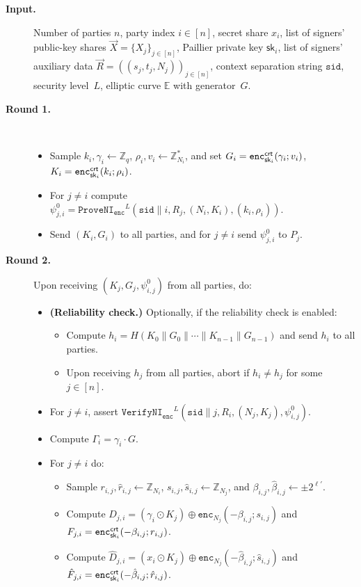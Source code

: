 \documentclass[11pt]{article}
\def\crt{{\sf crt}}
\newcommand{\enc}{\ensuremath{\mathtt{enc}}}
\newcommand{\enci}[1]{\ensuremath{\mathtt{enc}_{N_{#1}}}}
\newcommand{\sid}{\ensuremath{\mathtt{sid}}}
\newcommand{\proveni}[1]{\ensuremath{\mathtt{ProveNI}_{\mathtt{#1}}}}
\newcommand{\verifyni}[1]{\ensuremath{\mathtt{VerifyNI}_{\mathtt{#1}}}}
\newcommand{\sk}{\textsf{sk}}
\newcommand{\pk}{\textsf{pk}}
\newcommand{\E}{\mathbb{E}}
\newcommand{\Z}{\mathbb{Z}}
\newcommand{\?}[1]{\stackrel{?}{#1}}
\begin{document}
\begin{description}
    \item[\textbf{Input.}] Number of parties $n$, party index $i\in [n]$, secret share $x_i$, list of signers' public-key shares $\vec X = \{X_j\}_{j \in [n]}$, 
    Paillier private key $\sk_i$, list of signers' auxiliary data $\vec R = ((s_j, t_j, N_j))_{j\in[n]}$, context separation string $\sid$, security level~$L$, elliptic curve $\E$ with generator~$G$.

    \item[\textbf{Round 1.}] \
    \begin{itemize}
        \item Sample $k_i, \gamma_i \gets \Z_q$, $\rho_i, v_i \gets \Z^*_{N_i}$, and set $G_i = \enc^\crt_{\sk_i}(\gamma_i; v_i)$,
            $K_i = \enc^\crt_{\sk_i}(k_i; \rho_i)$. 
        \item For $j \ne i$ compute $\psi^0_{j,i} = \proveni{enc}^{L}(\sid \| i, R_j, (N_i, K_i), (k_i, \rho_i))$. 
        \item Send $(K_i, G_i)$ to all parties, and for $j \neq i$ send $\psi^0_{j,i}$ to $P_j$.
    \end{itemize}


    \item[\textbf{Round 2.}] Upon receiving $(K_j, G_j, \psi^0_{i,j})$ from all parties, do:
    \begin{itemize}
     \item {\bf (Reliability check.)} Optionally, if the reliability check is enabled:
    \begin{itemize}
        \item Compute $h_i = H(K_0 \| G_0 \| \cdots \| K_{n-1} \| G_{n-1})$
        and 
        send $h_i$ to all parties.
        
        \item Upon receiving $h_j$ from all parties, abort if 
        $h_i \neq h_j$ for some $j \in [n]$.
    \end{itemize}
        \item For $j \neq i$, assert $\verifyni{enc}^{L}(\sid \| j, R_i, (N_j, K_j), \psi^0_{i,j})$. 
        
        \item Compute $\Gamma_i = \gamma_i \cdot G$.
        \item For $j \neq i$ do:
        \begin{itemize}
            \item Sample $r_{i,j}, \hat{r}_{i,j} \gets \Z_{N_i}$,
                $s_{i,j}, \hat{s}_{i,j} \gets \Z_{N_j}$, and
                $\beta_{i,j}, \hat{\beta}_{i,j} \gets \pm 2^{\ell'}$.
            \item Compute $D_{j,i} = (\gamma_i \odot K_j) \oplus \enci{j}(-\beta_{i,j}; s_{i,j})$
                and $F_{j,i} = \enc^\crt_{\sk_i}(-\beta_{i,j}; r_{i,j})$.
            \item Compute $\hat{D}_{j,i} = (x_i \odot K_j) \oplus \enci{j}(-\hat{\beta}_{i,j}; \hat{s}_{i,j})$
                and $\hat{F}_{j,i} = \enc^\crt_{\sk_i}(-\hat{\beta}_{i,j}; \hat{r}_{i,j})$.


\end{itemize}
\end{itemize}
\end{description}
\end{document}
